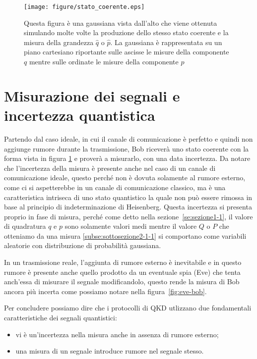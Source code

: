 \begin{figure}[h] 
\begin{center}
\texttt{[image: figure/stato\_coerente.eps]}
\end{center}
\caption[Stato coerente]{Questa figura \`e una gaussiana vista dall'alto che viene ottenuta simulando molte volte la produzione dello stesso stato coerente e la misura della grandezza $\hat q$ o $\hat p$. La gaussiana \`e rappresentata su un piano cartesiano riportante sulle ascisse le misure della componente $q$ mentre sulle ordinate le misure della componente $p$} \label{fig:stato-coerente}
\end{figure}

\section{Misurazione dei segnali e incertezza quantistica}
Partendo dal caso ideale, in cui il canale di comunicazione \`e perfetto e quindi non aggiunge rumore durante la trasmissione, Bob ricever\`a uno stato coerente con la forma vista in figura \ref{fig:stato-coerente} e proverà a misurarlo, con una data incertezza. Da notare che l'incertezza della misura \`e presente anche nel caso di un canale di comunicazione ideale, questo perch\'e non \`e dovuta solamente al rumore esterno, come ci si aspetterebbe in un canale di comunicazione classico, ma \`e una caratteristica intriseca di uno stato quantistico la quale non pu\`o essere rimossa in base al principio di indeterminazione di Heisenberg. Questa incertezza si presenta proprio in fase di misura, perch\'e come detto nella sezione~\ref{se:sezione1-1}, il valore di quadratura $q$ e $p$ sono solamente valori medi mentre il valore $Q$ o $P$ che otteniamo da una misura \ref{subse:sottosezione2-1-1} si comportano come variabili aleatorie con distribuzione di probabilit\`a gaussiana. 

In un trasmissione reale, l'aggiunta di rumore esterno \`e inevitabile e in questo rumore \`e presente anche quello prodotto da un eventuale spia (Eve) che tenta anch'essa di misurare il segnale modificandolo, questo rende la misura di Bob ancora pi\`u incerta come possiamo notare nella figura~\ref{fig:eve-bob}. 

Per concludere possiamo dire che i protocolli di QKD utlizzano due fondamentali caratteristiche dei segnali quantistici:
\begin{itemize}
\item vi è un'incertezza nella misura anche in assenza di rumore esterno;
\item una misura di un segnale introduce rumore nel segnale stesso.
\end{itemize}

